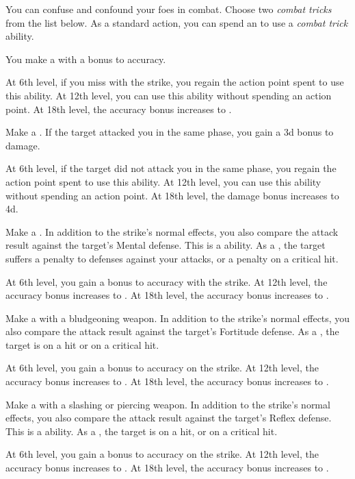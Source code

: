         You can confuse and confound your foes in combat.
        Choose two \textit{combat tricks} from the list below.
        As a standard action, you can spend an  to use a \textit{combat trick} ability.
        {
             You make a  with a  bonus to accuracy.
            \par At 6th level, if you miss with the strike, you regain the action point spent to use this ability.
            At 12th level, you can use this ability without spending an action point.
            At 18th level, the accuracy bonus increases to .

             Make a .
            If the target attacked you in the same phase, you gain a \plus3d bonus to damage.
            \par At 6th level, if the target did not attack you in the same phase, you regain the action point spent to use this ability.
            At 12th level, you can use this ability without spending an action point.
            At 18th level, the damage bonus increases to \plus4d.

             Make a .
            In addition to the strike's normal effects, you also compare the attack result against the target's Mental defense.
            This is a  ability.
            As a , the target suffers a  penalty to defenses against your attacks, or a  penalty on a critical hit.
            \par At 6th level, you gain a  bonus to accuracy with the strike.
            At 12th level, the accuracy bonus increases to .
            At 18th level, the accuracy bonus increases to .

             Make a  with a bludgeoning weapon.
            In addition to the strike's normal effects, you also compare the attack result against the target's Fortitude defense.
            As a , the target is \sickened on a hit or \nauseated on a critical hit.
            \par At 6th level, you gain a  bonus to accuracy on the strike.
            At 12th level, the accuracy bonus increases to .
            At 18th level, the accuracy bonus increases to .

             Make a  with a slashing or piercing weapon.
            In addition to the strike's normal effects, you also compare the attack result against the target's Reflex defense.
            This is a  ability.
            As a , the target is \slowed on a hit, or \immobilized on a critical hit.
            \par At 6th level, you gain a  bonus to accuracy on the strike.
            At 12th level, the accuracy bonus increases to .
            At 18th level, the accuracy bonus increases to .

}
